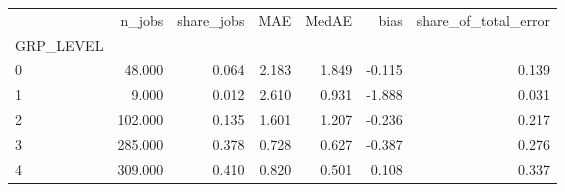 \begin{tabular}{lrrrrrr}
\toprule
 & n_jobs & share_jobs & MAE & MedAE & bias & share_of_total_error \\
GRP_LEVEL &  &  &  &  &  &  \\
\midrule
0 & 48.000 & 0.064 & 2.183 & 1.849 & -0.115 & 0.139 \\
1 & 9.000 & 0.012 & 2.610 & 0.931 & -1.888 & 0.031 \\
2 & 102.000 & 0.135 & 1.601 & 1.207 & -0.236 & 0.217 \\
3 & 285.000 & 0.378 & 0.728 & 0.627 & -0.387 & 0.276 \\
4 & 309.000 & 0.410 & 0.820 & 0.501 & 0.108 & 0.337 \\
\bottomrule
\end{tabular}
